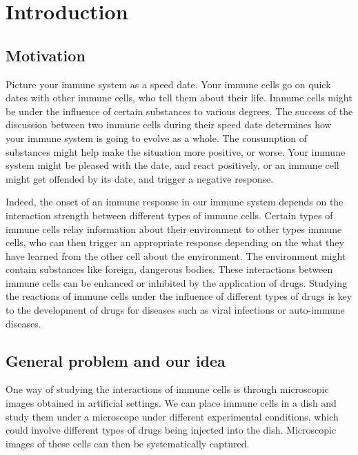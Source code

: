 \chapter{Introduction}

\section{Motivation}

Picture your immune system as a speed date. Your immune cells go on quick dates with other immune cells, who tell them about their life. Immune cells might be under the influence of certain substances to various degrees. The success of the discussion between two immune cells during their speed date determines how your immune system is going to evolve as a whole. The consumption of substances might help make the situation more positive, or worse. Your immune system might be pleased with the date, and react positively, or an immune cell might get offended by its date, and trigger a negative response. %


Indeed, the onset of an immune response in our immune system depends on the interaction strength between different types of immune cells. Certain types of immune cells relay information about their environment to other types immune cells, who can then trigger an appropriate response depending on the what they have learned from the other cell about the environment. The environment might contain substances like foreign, dangerous bodies. These interactions between immune cells can be enhanced or inhibited by the application of drugs. Studying the reactions of immune cells under the influence of different types of drugs is key to the development of drugs for diseases such as viral infections or auto-immune diseases.

\section{General problem and our idea}

One way of studying the interactions of immune cells is through microscopic images obtained in artificial settings. We can place immune cells in a dish and study them under a microscope under different experimental conditions, which could involve different types of drugs being injected into the dish. Microscopic images of these cells can then be systematically captured.

